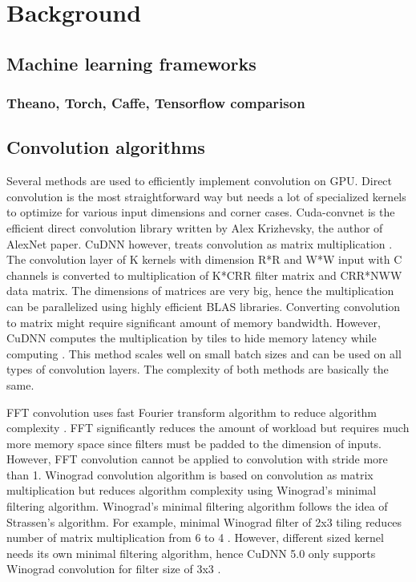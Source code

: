 \documentclass[conference]{IEEEtran}
\begin{document}
\section{Background}

\subsection{Machine learning frameworks}

\subsubsection{Theano, Torch, Caffe, Tensorflow comparison}

\subsection{Convolution algorithms}
Several methods are used to efficiently implement convolution on GPU.
Direct convolution is the most straightforward way but needs a lot of specialized kernels to optimize for various input dimensions and corner cases.
Cuda-convnet \cite{} is the efficient direct convolution library written by Alex Krizhevsky, the author of AlexNet paper.
CuDNN however, treats convolution as matrix multiplication \cite{}.
The convolution layer of K kernels with dimension R*R and W*W input with C channels is converted to multiplication of K*CRR filter matrix and CRR*NWW data matrix.
The dimensions of matrices are very big, hence the multiplication can be parallelized using highly efficient BLAS libraries.
Converting convolution to matrix might require significant amount of memory bandwidth.
However, CuDNN computes the multiplication by tiles to hide memory latency while computing \cite{}.
This method scales well on small batch sizes and can be used on all types of convolution layers.
The complexity of both methods are basically the same.

FFT convolution uses fast Fourier transform algorithm to reduce algorithm complexity \cite{}.
FFT significantly reduces the amount of workload but requires much more memory space since filters must be padded to the dimension of inputs.
However, FFT convolution cannot be applied to convolution with stride more than 1.
Winograd convolution algorithm is based on convolution as matrix multiplication but reduces algorithm complexity using Winograd's minimal filtering algorithm.
Winograd’s minimal filtering algorithm follows the idea of Strassen’s algorithm.
For example, minimal Winograd filter of 2x3 tiling reduces number of matrix multiplication from 6 to 4 \cite{}.
However, different sized kernel needs its own minimal filtering algorithm, hence CuDNN 5.0 only supports Winograd convolution for filter size of 3x3 \cite{}.
\end{document}

